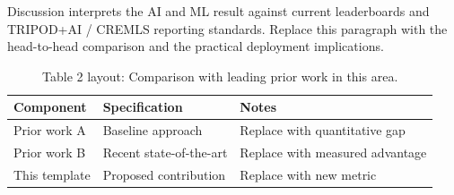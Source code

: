 
Discussion interprets the AI and ML result against current leaderboards and TRIPOD+AI / CREMLS reporting standards. Replace this paragraph with the head-to-head comparison and the practical deployment implications.

\begin{table}[H]
\caption{Table 2 layout: Comparison with leading prior work in this area.}
\label{tab:discussion_compare}
\centering
\begin{tabular}{>{\raggedright\arraybackslash}p{3.4cm} >{\raggedright\arraybackslash}p{4.6cm} >{\raggedright\arraybackslash}p{5.4cm}}
\toprule
\textbf{Component} & \textbf{Specification} & \textbf{Notes} \\
\midrule
  Prior work A & Baseline approach & Replace with quantitative gap \\
  Prior work B & Recent state-of-the-art & Replace with measured advantage \\
  This template & Proposed contribution & Replace with new metric \\
\bottomrule
\end{tabular}
\end{table}
